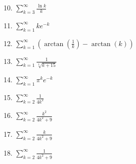 \documentclass[12pt]{article}
\newif\ifans
\begin{document}
\begin{enumerate}
\setcounter{enumi}{9}

\item $\sum_{k=3}^{\infty}\frac{\ln{k}}{k}$

\ifans{\fbox{The series diverges by the Integral Test.}} \fi

\item $\sum_{k=1}^{\infty}{ke^{-k}}$

\ifans{\fbox{The series converges by the Integral Test.}} \fi

\item $\sum_{k=1}^{\infty}{\left(\arctan\left(\frac{1}{k}\right)-\arctan(k)\right)}$

\ifans{\fbox{The series diverges by the Divergence Test. [see \underline{Sequences} problem \#33.]}} \fi

\item $\sum_{k=1}^{\infty}{\frac{1}{\sqrt[4]{k+15}}}$

\ifans{\fbox{$\sum_{k=1}^{\infty}{\frac{1}{\sqrt[4]{k+15}}}=\sum_{k=16}^{\infty}{\frac{1}{\sqrt[4]{k}}}$, which is a $p$-series with $p=\frac{1}{4}<1$, so the series diverges.   }} \fi

\item $\sum_{k=1}^{\infty}{\pi^k e^{-k}}$

\ifans{\fbox{\parbox{1\linewidth}{The series diverges by the Divergence Test. Also, observe that this is a geometric series with ratio $r=\textstyle \frac{\pi}{e}>1$, which confirms that the series diverges.}}} \fi

\item $\sum_{k=2}^{\infty}{\frac{1}{4k^2}}$

\ifans{\fbox{The series is a constant multiple of a $p$-series with $p=2>1$, so the series converges.}} \fi

\item $\sum_{k=2}^{\infty}{\frac{k^2}{4k^2+9}}$

\ifans{\fbox{The series diverges by the Divergence Test.}} \fi

\item $\sum_{k=2}^{\infty}{\frac{k}{4k^2+9}}$

\ifans{\fbox{The series diverges by the Integral Test.}} \fi

\item $\sum_{k=2}^{\infty}{\frac{1}{4k^2+9}}$

\ifans{\fbox{The series converges by the Integral Test.; Detailed Solution: \textcolor{blue}{\href{http://www.math.drexel.edu/classes/Calculus/resources/Math123HW/Solutions/123_08_Convergence_Tests_18.pdf}{Here}}}} \fi


\end{enumerate}
\end{document}
